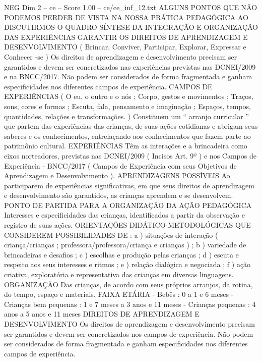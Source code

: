 \begin{textsample}{NEG Dim 2 – ce – Score 1.00 – ce/ce\_inf\_12.txt}  \label{ex:f2_neg_210}
ALGUNS PONTOS QUE NÃO PODEMOS PERDER DE VISTA NA NOSSA PRÁTICA PEDAGÓGICA AO DISCUTIRMOS O QUADRO SÍNTESE DA INTEGRAÇÃO E ORGANIZAÇÃO DAS EXPERIÊNCIAS GARANTIR OS DIREITOS DE APRENDIZAGEM E DESENVOLVIMENTO ( Brincar, Conviver, Participar, Explorar, Expressar e Conhecer -se ) Os direitos de aprendizagem e desenvolvimento precisam ser garantidos e devem ser concretizados nas experiências previstas nas DCNEI/2009 e na BNCC/2017.
Não podem ser considerados de forma fragmentada e ganham especificidades nos diferentes campos de experiência.
CAMPOS DE EXPERIÊNCIAS ( O eu, o outro e o nós ; Corpo, gestos e movimentos ; Traços, sons, cores e formas ; Escuta, fala, pensamento e imaginação ; Espaços, tempos, quantidades, relações e transformações. ) Constituem um “ arranjo curricular ” que partem das experiências das crianças, de suas ações cotidianas e abrigam seus saberes e os conhecimentos, entrelaçando aos conhecimentos que fazem parte ao patrimônio cultural.
EXPERIÊNCIAS Têm as interações e a brincadeira como eixos norteadores, previstas nas DCNEI/2009 ( Incisos Art. 9º ) e nos Campos de Experiência - BNCC/2017 ( Campos de Experiência com seus Objetivos de Aprendizagem e Desenvolvimento ).
APRENDIZAGENS POSSÍVEIS Ao participarem de experiências significativas, em que seus direitos de aprendizagem e desenvolvimento são garantidos, as crianças aprendem e se desenvolvem.
PONTO DE PARTIDA PARA A ORGANIZAÇÃO DA AÇÃO PEDAGÓGICA Interesses e especificidades das crianças, identificados a partir da observação e registro de suas ações.
ORIENTAÇÕES DIDÁTICO-METODOLÓGICAS QUE CONSIDEREM POSSIBILIDADES DE : a ) situações de interação ( criança/crianças ; professora/professora/criança e crianças ) ; b ) variedade de brincadeiras e desafios ; c ) escolhas e produção pelas crianças ; d ) escuta e respeito aos seus interesses e ritmos ; e ) relação dialógica e negociada ; f ) ação criativa, exploratória e representativa das crianças em diversas linguagens.
ORGANIZAÇÃO Das crianças, de acordo com seus próprios arranjos, da rotina, do tempo, espaço e materiais.
FAIXA ETÁRIA - Bebês : 0 a 1 e 6 meses - Crianças bem pequenas : 1 e 7 meses a 3 anos e 11 meses - Crianças pequenas : 4 anos a 5 anos e 11 meses DIREITOS DE APRENDIZAGEM E DESENVOLVIMENTO Os direitos de aprendizagem e desenvolvimento precisam ser garantidos e devem ser concretizados nos campos de experiência.
Não podem ser considerados de forma fragmentada e ganham especificidades nos diferentes campos de experiência.

\end{textsample}
